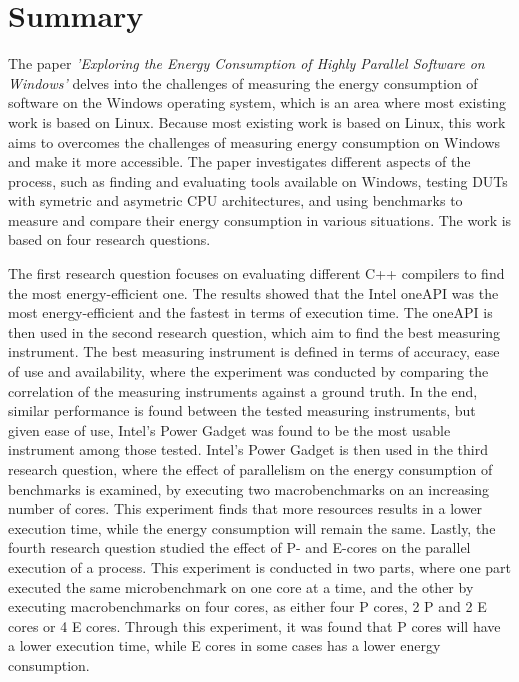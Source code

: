 \section*{Summary}

The paper \textit{'Exploring the Energy Consumption of Highly Parallel Software on Windows'} delves into the challenges of measuring the energy consumption of software on the Windows operating system, which is an area where most existing work is based on Linux. Because most existing work is based on Linux, this work aims to overcomes the challenges of measuring energy consumption on Windows and make it more accessible. The paper investigates different aspects of the process, such as finding and evaluating tools available on Windows, testing DUTs with symetric and asymetric CPU architectures, and using benchmarks to measure and compare their energy consumption in various situations. The work is based on four research questions.

The first research question focuses on evaluating different C++ compilers to find the most energy-efficient one. The results showed that the Intel oneAPI was the most energy-efficient and the fastest in terms of execution time. The oneAPI is then used in the second research question, which aim to find the best measuring instrument. The best measuring instrument is defined in terms of accuracy, ease of use and availability, where the experiment was conducted by comparing the correlation of the measuring instruments against a ground truth. In the end, similar performance is found between the tested measuring instruments, but given ease of use, Intel's Power Gadget was found to be the most usable instrument among those tested. Intel's Power Gadget is then used in the third research question, where the effect of parallelism on the energy consumption of benchmarks is examined, by executing two macrobenchmarks on an increasing number of cores. This experiment finds that more resources results in a lower execution time, while the energy consumption will remain the same. Lastly, the fourth research question studied the effect of P- and E-cores on the parallel execution of a process. This experiment is conducted in two parts, where one part executed the same microbenchmark on one core at a time, and the other by executing macrobenchmarks on four cores, as either four P cores, 2 P and 2 E cores or 4 E cores. Through this experiment, it was found that P cores will have a lower execution time, while E cores in some cases has a lower energy consumption.

